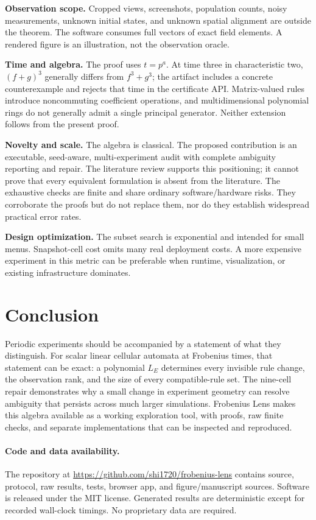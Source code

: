 \documentclass[11pt]{article}
\begin{document}
\textbf{Observation scope.} Cropped views, screenshots, population counts, noisy measurements, unknown initial states, and unknown spatial alignment are outside the theorem. The software consumes full vectors of exact field elements. A rendered figure is an illustration, not the observation oracle.

\textbf{Time and algebra.} The proof uses $t=p^a$. At time three in characteristic two, $(f+g)^3$ generally differs from $f^3+g^3$; the artifact includes a concrete counterexample and rejects that time in the certificate API. Matrix-valued rules introduce noncommuting coefficient operations, and multidimensional polynomial rings do not generally admit a single principal generator. Neither extension follows from the present proof.

\textbf{Novelty and scale.} The algebra is classical. The proposed contribution is an executable, seed-aware, multi-experiment audit with complete ambiguity reporting and repair. The literature review supports this positioning; it cannot prove that every equivalent formulation is absent from the literature. The exhaustive checks are finite and share ordinary software/hardware risks. They corroborate the proofs but do not replace them, nor do they establish widespread practical error rates.

\textbf{Design optimization.} The subset search is exponential and intended for small menus. Snapshot-cell cost omits many real deployment costs. A more expensive experiment in this metric can be preferable when runtime, visualization, or existing infrastructure dominates.

\section{Conclusion}
Periodic experiments should be accompanied by a statement of what they distinguish. For scalar linear cellular automata at Frobenius times, that statement can be exact: a polynomial $L_E$ determines every invisible rule change, the observation rank, and the size of every compatible-rule set. The nine-cell repair demonstrates why a small change in experiment geometry can resolve ambiguity that persists across much larger simulations. Frobenius Lens makes this algebra available as a working exploration tool, with proofs, raw finite checks, and separate implementations that can be inspected and reproduced.

\paragraph{Code and data availability.}
The repository at \url{https://github.com/shi1720/frobenius-lens} contains source, protocol, raw results, tests, browser app, and figure/manuscript sources. Software is released under the MIT license. Generated results are deterministic except for recorded wall-clock timings. No proprietary data are required.
\end{document}

